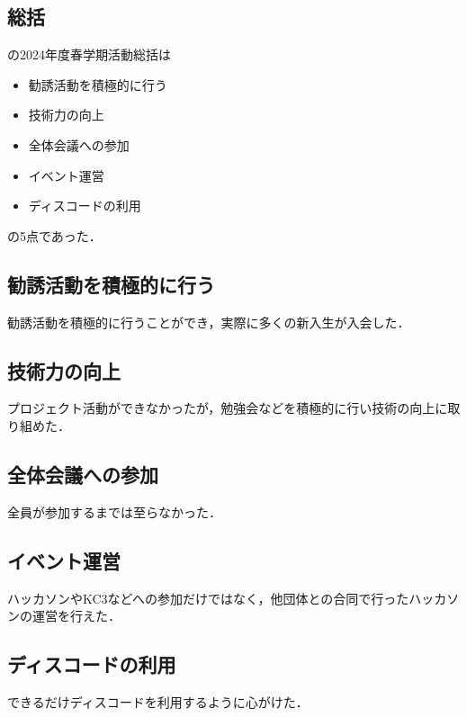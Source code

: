 \subsection*{\thirdGrade{}総括}




\thirdGrade{}の2024年度春学期活動総括は
\begin{itemize}
    \item 勧誘活動を積極的に行う
    \item 技術力の向上
    \item 全体会議への参加
    \item イベント運営
    \item ディスコードの利用
\end{itemize}
の5点であった．

\subsection*{勧誘活動を積極的に行う}
勧誘活動を積極的に行うことができ，実際に多くの新入生が入会した．

\subsection*{技術力の向上}
プロジェクト活動ができなかったが，勉強会などを積極的に行い技術の向上に取り組めた．

\subsection*{全体会議への参加}
全員が参加するまでは至らなかった．

\subsection*{イベント運営}
ハッカソンやKC3などへの参加だけではなく，他団体との合同で行ったハッカソンの運営を行えた．

\subsection*{ディスコードの利用}
できるだけディスコードを利用するように心がけた．